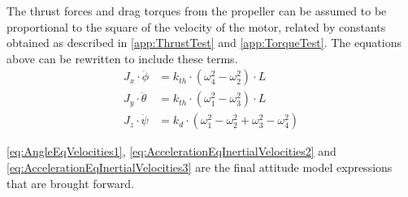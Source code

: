 The thrust forces and drag torques from the propeller can be assumed to be proportional to the square of the velocity of the motor, related by constants obtained as described in \autoref{app:ThrustTest} and \ref{app:TorqueTest}. The equations above can be rewritten to include these terms.
%
\begin{align}
J_x\cdot\ddot{\phi}&=k_{th} \cdot(\omega^2_4-\omega^2_2) \cdot L \label{eq:AngleEqVelocities1}\\
J_y \cdot\ddot{\theta}&=k_{th} \cdot(\omega^2_1-\omega^2_3) \cdot L \label{eq:AngleEqVelocities2} \\
J_z\cdot\ddot{\psi}&=k_d \cdot(\omega^2_1-\omega^2_2+\omega^2_3-\omega^2_4)
\label{eq:AngleEqVelocities3}
\end{align}
\begin{where}
\end{where}

\autoref{eq:AngleEqVelocities1}, \ref{eq:AccelerationEqInertialVelocities2} 
and \ref{eq:AccelerationEqInertialVelocities3} are the final attitude model expressions that are brought forward. %